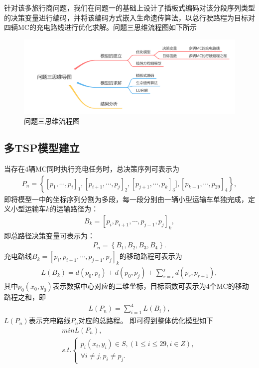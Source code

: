 \documentclass{whutmod}
\begin{document}
\begin{table}[H]
\begin{tablenotes}
    针对该多旅行商问题，我们在问题一的基础上设计了插板式编码对该分段序列类型的决策变量进行编码，并将该编码方式嵌入生命遗传算法，以总行驶路程为目标对四辆MC的充电路线进行优化求解。问题三思维流程图如下所示
    
    \begin{figure}[H]
    	\centering
    	\includegraphics[width=\textwidth]{figures/3.png}
    	\caption{问题三思维流程图}\label{asdf}
    \end{figure}
      \subsection{多TSP模型建立}
      当存在$4$辆MC同时执行充电任务时，总决策序列可表示为
      \begin{gather*}
      P_n=\left \{[p_{1},\cdots,p_{i}]_1,[p_{i+1},\cdots,p_{j}]_2,[p_{j+1},\cdots, p_{k}]_{3}],[p_{k+1},\cdots,p_{29}]_4\right \},
      \end{gather*}
      即将模型一中的坐标序列分割为多段，每一段分别由一辆小型运输车单独完成，定义小型运输车$k$的运输路径为：
      \begin{gather*}
      B_k=[p_{i},p_{i+1},\cdots,p_{j-1},p_{j}]_k,
      \end{gather*}
      即总路径决策变量可表示为：
      \begin{gather*}
      P_n=\left \{B_1,B_2,B_3,B_4\right \}.
      \end{gather*}
      充电路线$B_k=[p_{i},p_{i+1},\cdots,p_{j-1},p_{j}]_k$的移动路程可表示为
      \begin{gather*}
     L(B_k)=d(p_0,p_{i})+d(p_0,p_{j})+\sum_{r=i}^{j}d(p_r,p_{r+1}) ,
      \end{gather*}
      其中$p_0(x_0,y_0)$表示数据中心对应的二维坐标，目标函数可表示为$4$个MC的移动路程之和，即
       \begin{gather}
      L(P_n)=\sum_{i=1}^{4}L(B_i),
      \end{gather}
      $L(P_n)$表示充电路线$P_n$对应的总路程。 即可得到整体优化模型如下 
      \begin{gather}
      min L(P_n) ,\\
      s.t.\left\{\begin{matrix}p_{i}(x_i,y_i)\in S,(1\leqslant i \leqslant 29 ,i\in Z),
      \\ \forall i \neq j,p_i \neq p_j .
      \end{matrix}\right.
      \end{gather}
      

\end{tablenotes}
\end{table}
\end{document}
